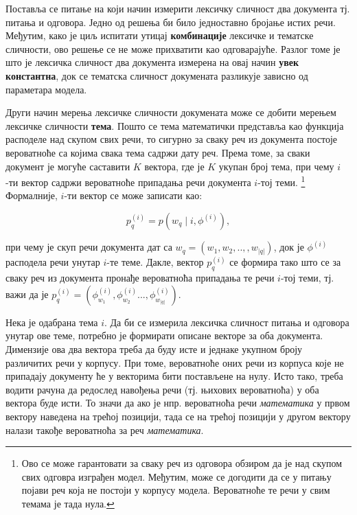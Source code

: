 Поставља се питање на који начин измерити лексичку сличност два документа тј. питања и одговора. Једно од решења би било једноставно бројање истих речи. Међутим, како је циљ испитати утицај \textbf{комбинације} лексичке и тематске сличности, ово решење се не може прихватити као одговарајуће. Разлог томе је што је лексичка сличност два документа измерена на овај начин \textbf{увек константна}, док се тематска сличност докумената разликује зависно од параметара модела. 	

Други начин мерења лексичке сличности докумената може се добити мерењем лексичке сличности \textbf{тема}.
Пошто се тема математички представља као функција расподеле над скупом свих речи, то сигурно за сваку реч из документа постоје вероватноће са којима свака тема садржи дату реч. Према томе, за сваки документ је могуће саставити $K$ вектора, где је $K$ укупан број тема, при чему $i$-ти вектор садржи вероватноће припадања речи документа  $i$-тој теми. \footnote{Ово се може гарантовати за сваку реч из одговора обзиром да је над скупом свих одговра изграђен модел. Међутим, може се догодити да се у питању појави реч која не постоји у корпусу модела. Вероватноће те речи у свим темама је тада нула.} Формалније, $i$-ти вектор се може записати као:

\begin{equation}
p_q^{(i)} = p(w_q \mid i,\phi^{(i)}),
\end{equation}

при чему је скуп речи документа дат са  $w_q = (w_1,w_2,..,,w_{|q|})$, док је $\phi^{(i)}$ расподела речи унутар  $i$-те теме. 
Дакле, вектор $p_q^{(i)}$ се формира тако што се за сваку реч из документа пронађе вероватноћа припадања те речи  $i$-тој теми, тј. важи да је 
$p_q^{(i)} = (\phi_{w_1}^{(i)},\phi_{w_2}^{(i)} ... ,\phi_{w_|q|}^{(i)}).$

Нека је одабрана тема  $i$. Да би се измерила лексичка сличност питања и одговора унутар ове теме, потребно је формирати описане векторе за оба документа. Димензије ова два вектора треба да буду исте и једнаке укупном броју различитих речи у корпусу. При томе, вероватноће оних речи из корпуса које не припадају документу ће у  векторима бити постављене на нулу.  Исто тако, треба водити рачуна да редослед навођења речи (тј. њихових вероватноћа) у оба вектора буде исти. То значи да ако је нпр. вероватноћа речи \textit{математика} у првом вектору наведена на трећој позицији, тада се на трећој позицији у другом вектору налази такође вероватноћа за реч \textit{математика}. 

